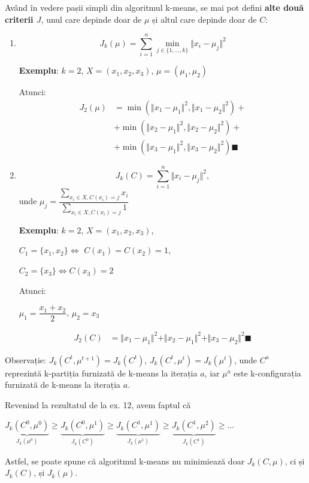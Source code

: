 \documentclass[12pt]{article}
\begin{document}
	
	Având în vedere pașii simpli din algoritmul k-means, se mai pot defini \textbf{alte două criterii $J$}, unul care depinde doar de $\mu$ și altul care depinde doar de $C$:
	\begin{enumerate}
		\item 	$$J_k(\mu) = \sum_{i=1}^{n} \min_{j \in \{1,\dots,k\}} \Vert x_i - \mu_j \Vert^2$$
		
		\textbf{Exemplu}: $k=2$, $X=(x_1,x_2,x_3)$, $\mu = (\mu_1,\mu_2)$
		
		Atunci:
		\begin{align*}
		J_2(\mu) &= \min(\Vert x_1 - \mu_1\Vert^2,\Vert x_1 - \mu_2\Vert^2) + \\
		&+ \min(\Vert x_2 - \mu_1\Vert^2,\Vert x_2 - \mu_2\Vert^2) +\\
		&+ \min(\Vert x_3 - \mu_1\Vert^2,\Vert x_3 - \mu_2\Vert^2) \blacksquare
		\end{align*}
		
		\item 	$$J_k(C) = \sum_{i=1}^{n} \Vert x_i - \mu_j \Vert^2,$$
		unde $\mu_j = \dfrac{\sum_{x_i\in X, C(x_i) = j}x_i}{\sum_{x_i\in X, C(x_i) = j}1}$
		
		\textbf{Exemplu}: $k=2$, $X=(x_1,x_2,x_3)$, 
		
		$C_1 = \{x_1,x_2\} \Leftrightarrow$ $C(x_1) = C(x_2) = 1$, 
		
		$C_2 = \{x_3\} \Leftrightarrow C(x_3) = 2$
		
		Atunci:
		
		$\mu_1 = \dfrac{x_1 + x_2}{2}$, $\mu_2 = x_3$
		
		\begin{align*}
		J_2(C) &= \Vert x_1 - \mu_1\Vert^2 + \Vert x_2 - \mu_1\Vert^2 + \Vert x_3 - \mu_2\Vert^2 \blacksquare
		\end{align*}
	\end{enumerate}

	Observație: $J_k(C^t,\mu^{t+1}) = J_k(C^t)$, $J_k(C^t,\mu^{t}) =  J_k(\mu^{t})$, unde $C^a$ reprezintă k-partiția furnizată de k-means la iterația $a$, iar $\mu^a$ este k-configurația furnizată de k-means la iterația $a$.

	Revenind la rezultatul de la ex. 12, avem faptul că 
	
	$\underbrace{J_k(C^0,\mu^0)}_{J_k(\mu^{0})} \geq \underbrace{J_k(C^0,\mu^1)}_{J_k(C^0)} \geq \underbrace{J_k(C^1,\mu^1)}_{J_k(\mu^{1})} \geq \underbrace{J_k(C^1,\mu^2)}_{J_k(C^1)} \geq \dots$
	
	Astfel, se poate spune că algoritmul k-means nu minimiează doar $J_k(C,\mu)$, ci și $J_k(C)$, și $J_k(\mu)$. 
	
\end{document}
